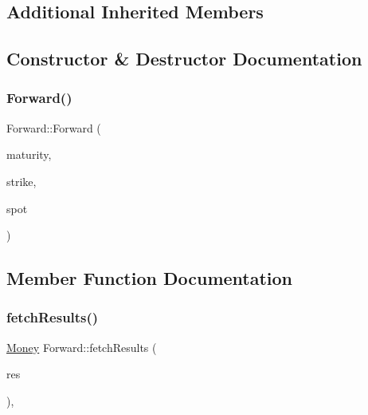 \subsection*{Additional Inherited Members}


\subsection{Constructor \& Destructor Documentation}
\hypertarget{class_forward_a7ec14e1a089290cae0e70c4cddd353b5}{}\label{class_forward_a7ec14e1a089290cae0e70c4cddd353b5} 
\subsubsection{\texorpdfstring{Forward()}{Forward()}}
{\footnotesize\ttfamily Forward\+::\+Forward (\begin{DoxyParamCaption}\item[{\hyperlink{_name_def_8h_ac2d3e0ba793497bcca555c7c2cf64ff3}{Time}}]{maturity,  }\item[{\hyperlink{_name_def_8h_a642a6c5fd87319d922637de0e0bb0305}{Quote}}]{strike,  }\item[{\hyperlink{_name_def_8h_a642a6c5fd87319d922637de0e0bb0305}{Quote}}]{spot }\end{DoxyParamCaption})}



\subsection{Member Function Documentation}
\hypertarget{class_forward_ab1e2edeb8345c8605013634a598d1ae5}{}\label{class_forward_ab1e2edeb8345c8605013634a598d1ae5} 
\subsubsection{\texorpdfstring{fetch\+Results()}{fetchResults()}}
{\footnotesize\ttfamily \hyperlink{_name_def_8h_a5a9d48c16a694e9a2d9f1eca730dc8c5}{Money} Forward\+::fetch\+Results (\begin{DoxyParamCaption}\item[{\hyperlink{class_pricing_engine_1_1_results}{Pricing\+Engine\+::\+Results} $\ast$const}]{res }\end{DoxyParamCaption})\hspace{0.3cm}{\ttfamily [override]}, {\ttfamily [virtual]}}



